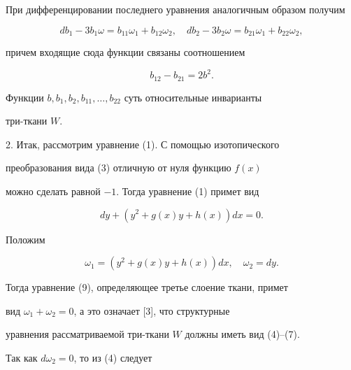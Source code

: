 При дифференцировании последнего уравнения аналогичным образом получим 


\begin{equation} 


db_1-3b_1\omega=b_{11}\omega_1+b_{12}\omega_2,\quad 


db_2-3b_2\omega=b_{21}\omega_1+b_{22}\omega_2, 


\end{equation} 


причем входящие сюда функции связаны соотношением 


\begin{equation} 


b_{12}-b_{21}=2b^2. 


\end{equation} 


Функции $b,b_1,b_2,b_{11},\dotsc,b_{22}$ суть относительные инварианты 


три-ткани $W$. 


\medskip 


 


2. Итак, рассмотрим уравнение (1). С помощью изотопического 


преобразования вида (3) отличную от нуля функцию $f(x)$  


можно сделать равной $-1$. Тогда уравнение (1) примет вид 


\begin{equation} 


dy+(y^2+g(x)y+h(x))dx=0. 


\end{equation} 


Положим 


\begin{equation} 


\omega_1=(y^2+g(x)y+h(x))dx,\quad \omega_2=dy. 


\end{equation} 


Тогда уравнение (9), определяющее третье слоение ткани, примет 


вид $\omega_1+\omega_2=0$, а это означает [3], что структурные 


уравнения рассматриваемой три-ткани $W$ должны иметь вид (4)--(7). 


 


Так как $d\omega_2=0$, то из (4) следует 


$$ 


